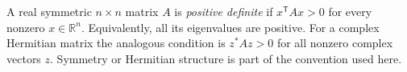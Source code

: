 
A real symmetric $n\times n$ matrix $A$ is \emph{positive definite} if $x^{\mathsf T}Ax>0$ for every nonzero $x\in\mathbb R^n$. Equivalently, all its eigenvalues are positive. For a complex Hermitian matrix the analogous condition is $z^*Az>0$ for all nonzero complex vectors $z$. Symmetry or Hermitian structure is part of the convention used here.
